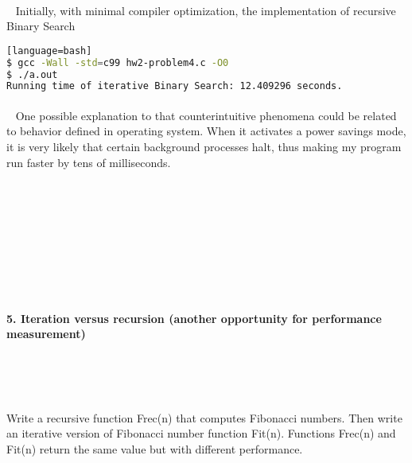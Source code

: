 \documentclass{article}
\begin{document}
\paragraph{}\
	\rmfamily
	Initially, with minimal compiler optimization, the implementation of recursive Binary Search

	\ttfamily
	\begin{lstlisting}[basicstyle=\small, language=bash][language=bash]	
$ gcc -Wall -std=c99 hw2-problem4.c -O0
$ ./a.out
Running time of iterative Binary Search: 12.409296 seconds.
	\end{lstlisting}
	
	\paragraph{}\
	\rmfamily
	One possible explanation to that counterintuitive phenomena could be related to behavior defined in operating system. When it activates a power savings mode, it is very likely that certain background processes halt, thus making my program run faster by tens of milliseconds.

\paragraph{}\
\paragraph{}\
\paragraph{}\
\paragraph{}\

	
	\rmfamily
	
	\paragraph{5. Iteration versus recursion (another opportunity for performance measurement) }\
	
	\rmfamily\
	
		Write a recursive function Frec(n) that computes Fibonacci numbers. Then write an iterative version of Fibonacci number function Fit(n). Functions Frec(n) and Fit(n) return the same value but with different performance.
		\newline
		
\end{document}
